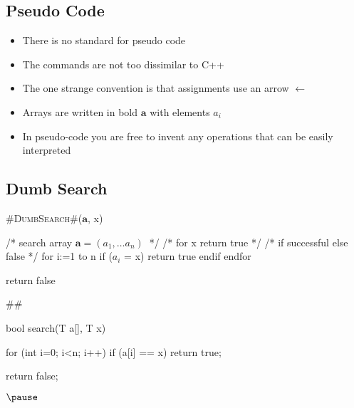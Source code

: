 
\begin{slide}
\section{Pseudo Code}

\begin{PauseHighLight}
  \begin{itemize}
  \item There is no standard for pseudo code\pause
  \item The commands are not too dissimilar to C++\pause
  \item The one strange convention is that assignments use an arrow
    $\leftarrow$\pauseh
  \item Arrays are written in bold $\bm{a}$ with elements $a_i$\pause
  \item In pseudo-code you are free to invent any operations that can be
    easily interpreted\pauseh
  \end{itemize}
\end{PauseHighLight}

\end{slide}


\Outline %

\begin{slide}
\section[-1]{Dumb Search}

\pausebuild
\color{TextColor}
\begin{minipage}{10cm}
\begin{pseudo}
#\textsc{DumbSearch}#($\bm{a}$, x)
{
  /* search array $\bm{a}=(a_1, \ldots a_n)\ $ */
  /* for x return true */
  /* if successful else false */
  for i:=1 to n
    if ($a_i$ = x)
      return true
    endif
  endfor

  return false
} #\pause#
\end{pseudo}
\end{minipage}\hfill
\begin{minipage}{12cm}
\begin{cpp}
bool search(T a[], T x)
{
  for (int i=0; i<n; i++) {
    if (a[i] == x)
      return true;
  }
  
  return false;
} $\pause$
\end{cpp}
\end{minipage}
\begin{center}
\pause
\end{center}
\end{slide}

